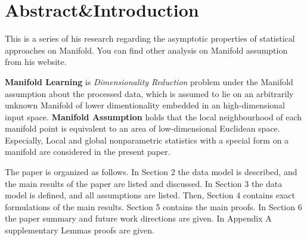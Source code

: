 \documentclass[10pt,a4paper]{article}
\begin{document}
\section{Abstract&Introduction}
This is a series of his research regarding the asymptotic properties of statistical approaches on Manifold. You can find other analysis on Manifold assumption from his website.

\textbf{Manifold Learning} is \textit{Dimensionality Reduction} problem under the Manifold assumption about the processed data, which is assumed to lie on an arbitrarily unknown Manifold of lower dimentionality embedded in an high-dimensional input space. \textbf{Manifold Assumption} holds that the local neighbourhood of each manifold point is equivalent to an area of low-dimensional Euclidean space. Especially, Local and global nonparametric statistics with a special form on a manifold are considered in the present paper.

The paper is organized as follows. In Section 2 the data model is described, and the
main results of the paper are listed and discussed. In Section 3 the data model is defined,
and all assumptions are listed. Then, Section 4 contains exact formulations of the main
results. Section 5 contains the main proofs. In Section 6 the paper summary and future
work directions are given. In Appendix A supplementary Lemmas proofs are given.
\end{document}
